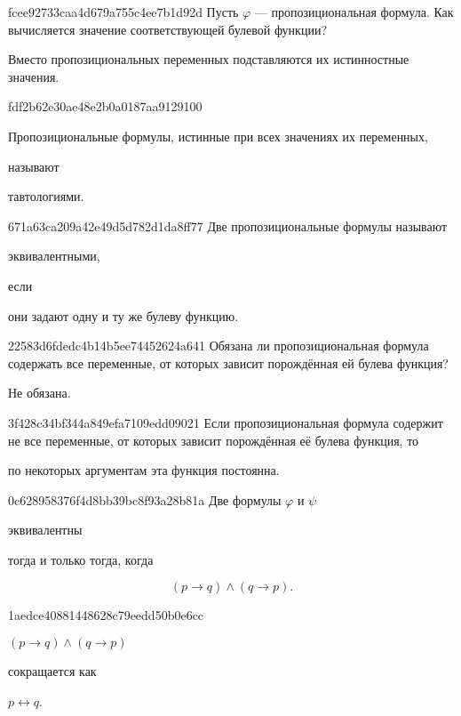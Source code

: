\begin{note}{fcee92733caa4d679a755c4ee7b1d92d}
    Пусть \({ \varphi }\) --- пропозициональная формула.
    Как вычисляется значение соответствующей булевой функции?

    \begin{cloze}{1}
        Вместо пропозициональных переменных подставляются их истинностные значения.
    \end{cloze}
\end{note}

\begin{note}{fdf2b62e30ae48e2b0a0187aa9129100}
    \begin{icloze}{2}Пропозициональные формулы, истинные при всех значениях их переменных,\end{icloze} называют \begin{icloze}{1}тавтологиями.\end{icloze}
\end{note}

\begin{note}{671a63ca209a42e49d5d782d1da8ff77}
    Две пропозициональные формулы называют \begin{icloze}{2}эквивалентными,\end{icloze} если \begin{icloze}{1}они задают одну и ту же булеву функцию.\end{icloze}
\end{note}

\begin{note}{22583d6fdedc4b14b5ee74452624a641}
    Обязана ли пропозициональная формула содержать все переменные, от которых зависит порождённая ей булева функция?

    \begin{cloze}{1}
        Не обязана.
    \end{cloze}
\end{note}

\begin{note}{3f428c34bf344a849efa7109edd09021}
    Если пропозициональная формула содержит не все переменные, от которых зависит порождённая её булева функция, то \begin{icloze}{1}по некоторых аргументам эта функция постоянна.\end{icloze}
\end{note}

\begin{note}{0c628958376f4d8bb39bc8f93a28b81a}
    Две формулы \({ \varphi }\) и \({ \psi }\) \begin{icloze}{2}эквивалентны\end{icloze} тогда и только тогда, когда
    \begin{icloze}{1}
        \[
            (p \to q) \land (q \to p).
        \]
    \end{icloze}
\end{note}

\begin{note}{1aedce40881448628c79eedd50b0e6cc}
    \begin{icloze}{2}\({ (p \to q) \land (q \to p) }\)\end{icloze} сокращается как \begin{icloze}{1}\({ p \leftrightarrow q }\).\end{icloze}
\end{note}


